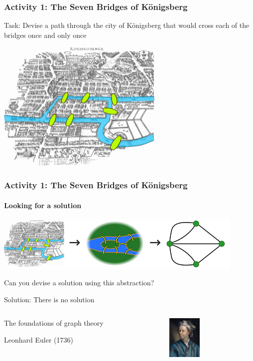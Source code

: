 \documentclass[xcolor=x11names]{beamer}
\begin{document}
\begin{frame}
\frametitle{Activity 1: The Seven Bridges of K\"onigsberg}

\alert{Task}: Devise a path through the city of K\"onigsberg that would cross
each of the bridges once and only once

\begin{center}
 \includegraphics[width=80mm]{img/Konigsberg_bridges.png}
\end{center}
\end{frame}

\begin{frame}
 \frametitle{Activity 1: The Seven Bridges of K\"onigsberg}
\framesubtitle{Looking for a solution}							\pause

\begin{center}
\includegraphics[width=120mm]{img/Konigsberg_bridges_graph.png}
\end{center}
\bigskip 								\pause

Can you devise a solution using this \alert{abstraction}?
\bigskip 								\pause

\alert{Solution}: There is no solution 				\pause


\begin{columns}
\begin{column}{0.45\textwidth}

The foundations of graph theory

Leonhard Euler (1736)
\end{column}
\begin{column}{0.4\textwidth}

\includegraphics[width=16mm]{img/371px-Leonhard_Euler.jpeg}
\end{column}
\end{columns}
\end{frame}
\end{document}
